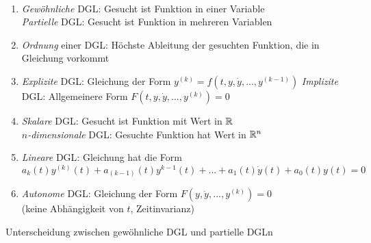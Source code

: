 \documentclass{cheat-sheet}
\begin{document}
\fi




\begin{defn}\mbox{}\\
  \begin{enumerate}[label=(\Roman*),leftmargin=2em]
    \item \emph{Gewöhnliche} DGL: Gesucht ist Funktion in einer Variable\\
    \emph{Partielle} DGL: Gesucht ist Funktion in mehreren Variablen
    \item \emph{Ordnung} einer DGL: Höchste Ableitung der gesuchten Funktion, die in Gleichung vorkommt
    \item \emph{Explizite} DGL: Gleichung der Form
    $y^{(k)} {=} f(t, y, \dot{y}, ..., y^{(k{-}1)})$
    \emph{Implizite} DGL: Allgemeinere Form $F(t, y, \dot{y}, ..., y^{(k)}) = 0$
    \item \emph{Skalare} DGL: Gesucht ist Funktion mit Wert in $\mathbb{R}$\\
    \emph{$n$-dimensionale} DGL: Gesuchte Funktion hat Wert in $\mathbb{R}^n$
    \item \emph{Lineare} DGL: Gleichung hat die Form
    \[ a_k(t) y^{(k)}(t) + a_{(k-1)}(t) y^{k-1}(t) + ... + a_1(t) \dot{y}(t) + a_0(t)y(t) = 0 \]
    \item \emph{Autonome} DGL: Gleichung der Form $F(y, \dot{y}, ..., y^{(k)}) = 0$\\
    (keine Abhängigkeit von $t$, Zeitinvarianz)
  \end{enumerate}
\end{defn}

\iffalse

Unterscheidung zwischen gewöhnliche DGL und partielle DGLn
\end{document}
